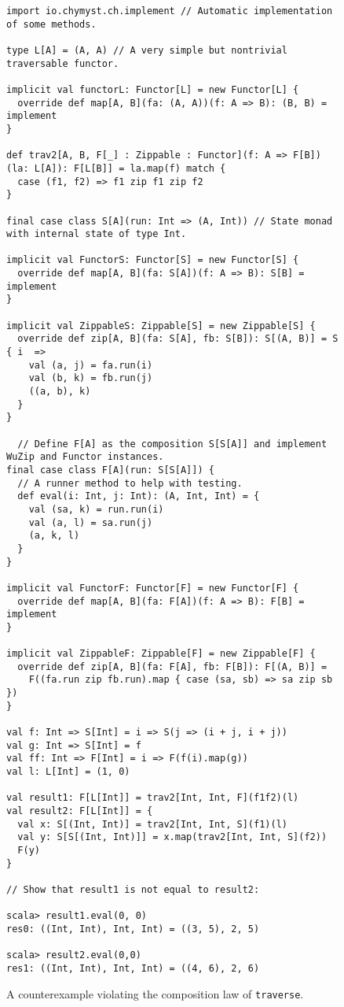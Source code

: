 \begin{figure}
\begin{centering}
\begin{lstlisting}[frame=single,fillcolor={\color{black}},framesep={0.2mm},framexleftmargin=2mm,framexrightmargin=2mm,framextopmargin=2mm,framexbottommargin=2mm]
import io.chymyst.ch.implement // Automatic implementation of some methods.

type L[A] = (A, A) // A very simple but nontrivial traversable functor.

implicit val functorL: Functor[L] = new Functor[L] {
  override def map[A, B](fa: (A, A))(f: A => B): (B, B) = implement
}

def trav2[A, B, F[_] : Zippable : Functor](f: A => F[B])(la: L[A]): F[L[B]] = la.map(f) match {
  case (f1, f2) => f1 zip f1 zip f2
}

final case class S[A](run: Int => (A, Int)) // State monad with internal state of type Int.

implicit val FunctorS: Functor[S] = new Functor[S] {
  override def map[A, B](fa: S[A])(f: A => B): S[B] = implement
}

implicit val ZippableS: Zippable[S] = new Zippable[S] {
  override def zip[A, B](fa: S[A], fb: S[B]): S[(A, B)] = S { i  =>
    val (a, j) = fa.run(i)
    val (b, k) = fb.run(j)
    ((a, b), k)
  }
}

  // Define F[A] as the composition S[S[A]] and implement WuZip and Functor instances.
final case class F[A](run: S[S[A]]) {
  // A runner method to help with testing.
  def eval(i: Int, j: Int): (A, Int, Int) = {
    val (sa, k) = run.run(i)
    val (a, l) = sa.run(j)
    (a, k, l)
  }
}

implicit val FunctorF: Functor[F] = new Functor[F] {
  override def map[A, B](fa: F[A])(f: A => B): F[B] = implement
}

implicit val ZippableF: Zippable[F] = new Zippable[F] {
  override def zip[A, B](fa: F[A], fb: F[B]): F[(A, B)] =
    F((fa.run zip fb.run).map { case (sa, sb) => sa zip sb })
}

val f: Int => S[Int] = i => S(j => (i + j, i + j))
val g: Int => S[Int] = f
val ff: Int => F[Int] = i => F(f(i).map(g))
val l: L[Int] = (1, 0)

val result1: F[L[Int]] = trav2[Int, Int, F](f1f2)(l)
val result2: F[L[Int]] = {
  val x: S[(Int, Int)] = trav2[Int, Int, S](f1)(l)
  val y: S[S[(Int, Int)]] = x.map(trav2[Int, Int, S](f2))
  F(y)
}

// Show that result1 is not equal to result2:

scala> result1.eval(0, 0)
res0: ((Int, Int), Int, Int) = ((3, 5), 2, 5)

scala> result2.eval(0,0)
res1: ((Int, Int), Int, Int) = ((4, 6), 2, 6) 
\end{lstlisting}
\par\end{centering}
\caption{A counterexample violating the composition law of \lstinline!traverse!.\label{fig:Full-code-implementing-traverse-law-counterexample}}
\end{figure}

